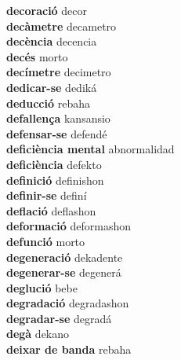 \textbf{ decoració  } decor \\
\textbf{ decàmetre  } decametro \\
\textbf{ decència  } decencia \\
\textbf{ decés  } morto \\
\textbf{ decímetre  } decimetro \\
\textbf{ dedicar-se  } dediká \\
\textbf{ deducció  } rebaha \\
\textbf{ defallença  } kansansio \\
\textbf{ defensar-se  } defendé \\
\textbf{ deficiència mental  } abnormalidad \\
\textbf{ deficiència  } defekto \\
\textbf{ definició  } definishon \\
\textbf{ definir-se  } definí \\
\textbf{ deflació  } deflashon \\
\textbf{ deformació  } deformashon \\
\textbf{ defunció  } morto \\
\textbf{ degeneració  } dekadente \\
\textbf{ degenerar-se  } degenerá \\
\textbf{ deglució  } bebe \\
\textbf{ degradació  } degradashon \\
\textbf{ degradar-se  } degradá \\
\textbf{ degà  } dekano \\
\textbf{ deixar de banda  } rebaha \\
